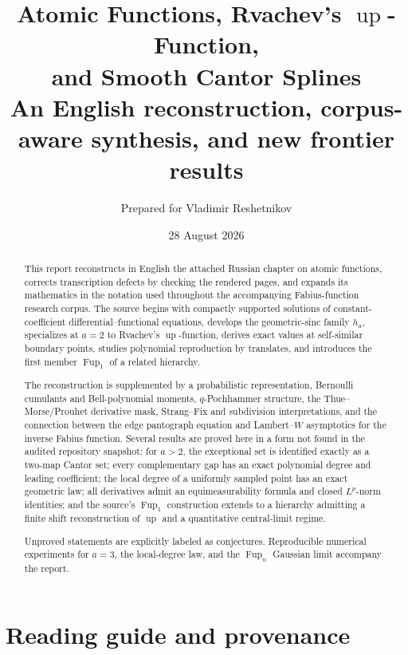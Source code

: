 \documentclass[11pt]{article}
\title{\textbf{Atomic Functions, Rvachev's \(\operatorname{up}\)-Function,\\and Smooth Cantor Splines}\\[0.7em]
\large An English reconstruction, corpus-aware synthesis, and new frontier results}
\author{Prepared for Vladimir Reshetnikov}
\date{28 August 2026}
\theoremstyle{definition}
\theoremstyle{remark}
\newcommand{\Up}{\operatorname{up}}
\newcommand{\Fup}{\operatorname{Fup}}
\begin{document}
\maketitle

\begin{abstract}
This report reconstructs in English the attached Russian chapter on atomic functions, corrects transcription defects by checking the rendered pages, and expands its mathematics in the notation used throughout the accompanying Fabius-function research corpus.  The source begins with compactly supported solutions of constant-coefficient differential--functional equations, develops the geometric-sinc family \(h_a\), specializes at \(a=2\) to Rvachev's \(\Up\)-function, derives exact values at self-similar boundary points, studies polynomial reproduction by translates, and introduces the first member \(\Fup_1\) of a related hierarchy.

The reconstruction is supplemented by a probabilistic representation, Bernoulli cumulants and Bell-polynomial moments, \(q\)-Pochhammer structure, the Thue--Morse/Prouhet derivative mask, Strang--Fix and subdivision interpretations, and the connection between the edge pantograph equation and Lambert--\(W\) asymptotics for the inverse Fabius function.  Several results are proved here in a form not found in the audited repository snapshot: for \(a>2\), the exceptional set is identified exactly as a two-map Cantor set; every complementary gap has an exact polynomial degree and leading coefficient; the local degree of a uniformly sampled point has an exact geometric law; all derivatives admit an equimeasurability formula and closed \(L^p\)-norm identities; and the source's \(\Fup_1\) construction extends to a hierarchy admitting a finite shift reconstruction of \(\Up\) and a quantitative central-limit regime.

Unproved statements are explicitly labeled as conjectures.  Reproducible numerical experiments for \(a=3\), the local-degree law, and the \(\Fup_n\) Gaussian limit accompany the report.
\end{abstract}

\tableofcontents

\section*{Reading guide and provenance}
\end{document}
